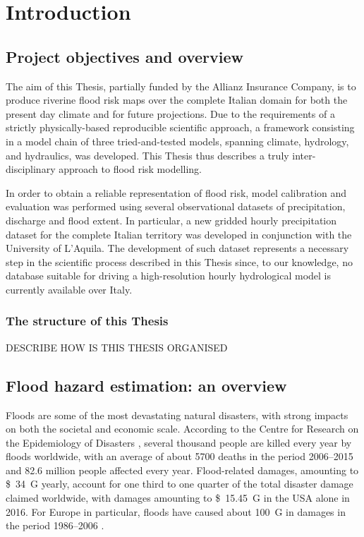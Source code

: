 \chapter{Introduction}

\section{Project objectives and overview}
The aim of this Thesis, partially funded by the Allianz Insurance Company, is to produce riverine flood risk maps over the complete Italian domain for both the present day climate and for future projections. Due to the requirements of a strictly physically-based reproducible scientific approach, a framework consisting in a model chain of three tried-and-tested models, spanning climate, hydrology, and hydraulics, was developed. This Thesis thus describes a truly inter-disciplinary approach to flood risk modelling.

In order to obtain a reliable representation of flood risk, model calibration and evaluation was performed using several observational datasets of precipitation, discharge and flood extent. In particular, a new gridded hourly precipitation dataset for the complete Italian territory was developed in conjunction with the University of L'Aquila. The development of such dataset represents a necessary step in the scientific process described in this Thesis since, to our knowledge, no database suitable for driving a high-resolution hourly hydrological model is currently available over Italy.\\

\subsection{The structure of this Thesis}
DESCRIBE HOW IS THIS THESIS ORGANISED

\section{Flood hazard estimation: an overview} \label{sec:flood_overview}
Floods are some of the most devastating natural disasters, with strong impacts on both the societal and economic scale. According to the Centre for Research on the Epidemiology of Disasters \citep{Guha-sapir2011}, several thousand people are killed every year by floods worldwide, with an average of about 5700 deaths in the period 2006--2015 and 82.6 million people affected every year. Flood-related damages, amounting to \SI{34}[\$]{G} yearly, account for one third \citep{MunichRE} to one quarter \citep{Guha-sapir2011} of the total disaster damage claimed worldwide, with damages amounting to \SI{15.45}[\$]{G} in the USA alone in 2016. For Europe in particular, floods have caused about \SI{100}[\€]{G} in damages in the period 1986--2006 \citep{Cea2007}.

